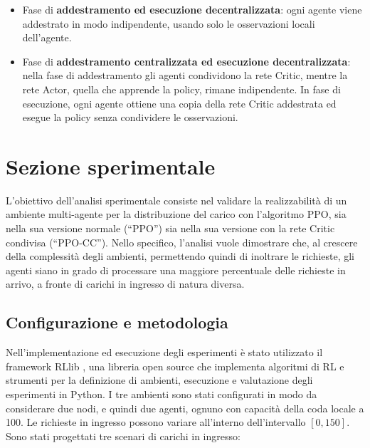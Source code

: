 \documentclass[a4paper, twocolumn]{article}
\begin{document}
\begin{itemize}
    \item Fase di \textbf{addestramento ed esecuzione decentralizzata}: ogni agente viene addestrato in modo indipendente, usando solo le osservazioni locali dell'agente.

    \item Fase di \textbf{addestramento centralizzata ed esecuzione decentralizzata}: nella fase di addestramento gli agenti condividono la rete Critic, mentre la rete Actor, quella che apprende la policy, rimane indipendente. In fase di esecuzione, ogni agente ottiene una copia della rete Critic addestrata ed esegue la policy senza condividere le osservazioni.
\end{itemize}

\section{Sezione sperimentale}

L'obiettivo dell'analisi sperimentale consiste nel validare la realizzabilità di un ambiente multi-agente per la distribuzione del carico con l'algoritmo PPO, sia nella sua versione normale (``PPO'') sia nella sua versione con la rete Critic condivisa (``PPO-CC''). Nello specifico, l'analisi vuole dimostrare che, al crescere della complessità degli ambienti, permettendo quindi di inoltrare le richieste, gli agenti siano in grado di processare una maggiore percentuale delle richieste in arrivo, a fronte di carichi in ingresso di natura diversa.

\subsection{Configurazione e metodologia}

Nell'implementazione ed esecuzione degli esperimenti è stato utilizzato il framework RLlib \cite{Liang2018}, una libreria open source che implementa algoritmi di RL e strumenti per la definizione di ambienti, esecuzione e valutazione degli esperimenti in Python. I tre ambienti sono stati configurati in modo da considerare due nodi, e quindi due agenti, ognuno con capacità della coda locale  a 100. Le richieste in ingresso possono variare all'interno dell'intervallo $[0, 150]$. Sono stati progettati tre scenari di carichi in ingresso:
\end{document}
